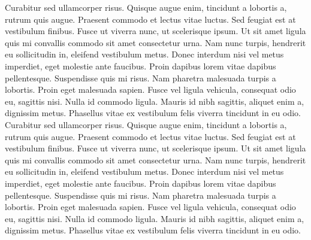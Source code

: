 \documentclass[12pt,letterpaper,oneside]{book}
\begin{document}
Curabitur sed ullamcorper risus. Quisque augue enim, tincidunt a lobortis a, rutrum quis augue. Praesent commodo et lectus vitae luctus. Sed feugiat est at vestibulum finibus. Fusce ut viverra nunc, ut scelerisque ipsum. Ut sit amet ligula quis mi convallis commodo sit amet consectetur urna. Nam nunc turpis, hendrerit eu sollicitudin in, eleifend vestibulum metus. Donec interdum nisi vel metus imperdiet, eget molestie ante faucibus. Proin dapibus lorem vitae dapibus pellentesque. Suspendisse quis mi risus. Nam pharetra malesuada turpis a lobortis. Proin eget malesuada sapien. Fusce vel ligula vehicula, consequat odio eu, sagittis nisi. Nulla id commodo ligula. Mauris id nibh sagittis, aliquet enim a, dignissim metus. Phasellus vitae ex vestibulum felis viverra tincidunt in eu odio. 
Curabitur sed ullamcorper risus. Quisque augue enim, tincidunt a lobortis a, rutrum quis augue. Praesent commodo et lectus vitae luctus. Sed feugiat est at vestibulum finibus. Fusce ut viverra nunc, ut scelerisque ipsum. Ut sit amet ligula quis mi convallis commodo sit amet consectetur urna. Nam nunc turpis, hendrerit eu sollicitudin in, eleifend vestibulum metus. Donec interdum nisi vel metus imperdiet, eget molestie ante faucibus. Proin dapibus lorem vitae dapibus pellentesque. Suspendisse quis mi risus. Nam pharetra malesuada turpis a lobortis. Proin eget malesuada sapien. Fusce vel ligula vehicula, consequat odio eu, sagittis nisi. Nulla id commodo ligula. Mauris id nibh sagittis, aliquet enim a, dignissim metus. Phasellus vitae ex vestibulum felis viverra tincidunt in eu odio. 
\end{document}
